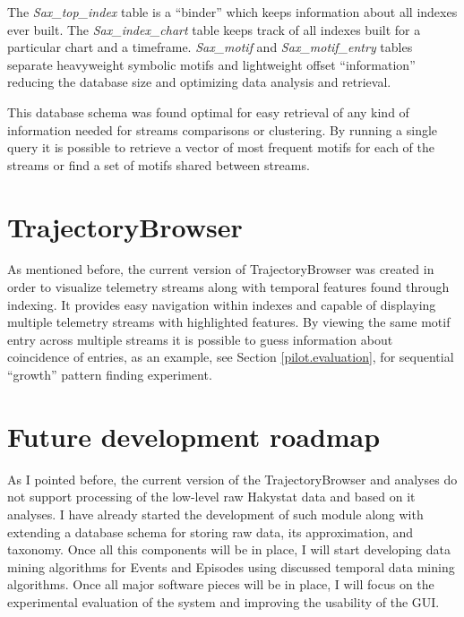 The \textit{Sax\_top\_index} table is a ``binder'' which keeps information about all indexes ever built. The \textit{Sax\_index\_chart} table keeps track of all indexes built for a particular chart and a timeframe. \textit{Sax\_motif} and \textit{Sax\_motif\_entry} tables separate heavyweight symbolic motifs and lightweight offset ``information'' reducing the database size and optimizing data analysis and retrieval. 

This database schema was found optimal for easy retrieval of any kind of information needed for streams comparisons or clustering. By running a single query it is possible to retrieve a vector of most frequent motifs for each of the streams or find a set of motifs shared between streams.

\section{TrajectoryBrowser}
As mentioned before, the current version of TrajectoryBrowser was created in order to visualize telemetry streams along with temporal features found through indexing. It provides easy navigation within indexes and capable of displaying multiple telemetry streams with highlighted features. By viewing the same motif entry across multiple streams it is possible to guess information about coincidence of entries, as an example, see Section \ref{pilot.evaluation}, for sequential ``growth'' pattern finding experiment.

\section{Future development roadmap}
As I pointed before, the current version of the TrajectoryBrowser and analyses do not support processing of the low-level raw Hakystat data and based on it analyses. I have already started the development of such module along with extending a database schema for storing raw data, its approximation, and taxonomy. Once all this components will be in place, I will start developing data mining algorithms for Events and Episodes using discussed temporal data mining algorithms. Once all major software pieces will be in place, I will focus on the experimental evaluation of the system and improving the usability of the GUI.